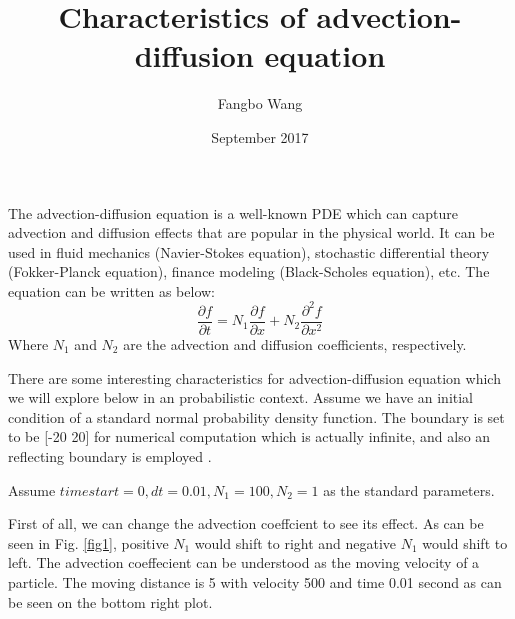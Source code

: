 \documentclass[12pt]{article}
\title{Characteristics of advection-diffusion equation}
\author{Fangbo Wang \\   }
\date{September 2017}
\begin{document}
\maketitle

The advection-diffusion equation is a well-known PDE which can capture advection and diffusion effects that are popular in the physical world. It can be used in fluid mechanics (Navier-Stokes equation), stochastic differential theory (Fokker-Planck equation), finance modeling (Black-Scholes equation), etc. The equation can be written as below:
\begin{equation}
\frac{\partial f}{\partial t}=N_1 \frac{\partial f}{\partial x} + N_2 \frac{\partial^2 f}{\partial x^2}
\end{equation}
Where $N_1$ and $N_2$ are the advection and diffusion coefficients, respectively.

There are some interesting characteristics for advection-diffusion equation which we will explore below in an probabilistic context. Assume we have an initial condition of a standard normal probability density function. The boundary is set to be [-20 20] for numerical computation which is actually infinite, and also an reflecting boundary is employed \cite{sett}. 

Assume $timestart=0, dt=0.01, N_1=100, N_2=1$ as the standard parameters. 

First of all, we can change the advection coeffcient to see its effect. As can be seen in Fig. \ref{fig1}, positive $N_1$ would shift to right and negative $N_1$ would shift to left. The advection coeffecient can be understood as the moving velocity of a particle. The moving distance is 5 with velocity 500 and time 0.01 second as can be seen on the bottom right plot.
\end{document}
